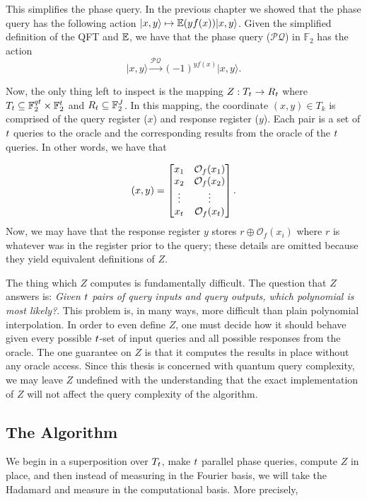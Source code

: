 \documentclass[12pt,twoside]{reedthesis}
\theoremstyle{definition}
\newlength{\arrow}
\newcommand{\F}{\mathbb{F}}
\newcommand{\ket}[1]{\ensuremath{\lvert #1\rangle}\xspace}
\begin{document}
This simplifies the phase query. In the previous chapter we showed that the phase query has the following action $\ket{x,y} \mapsto \expf(yf(x))\ket{x,y}$. Given the simplified definition of the QFT and $\mathbb{E}$, we have that the phase query ($\mathcal{PQ}$) in $\F_2$ has the action
\begin{equation}
\ket{x,y} \xrightarrow{\mathcal{PQ}} (-1)^{yf(x)} \ket{x,y}.
\end{equation}

Now, the only thing left to inspect is the mapping $Z: T_t \rightarrow R_t$ where $T_\numq \subseteq \F_2^{\numin \numq} \times \F_2^\numq$ and $R_\numq \subseteq \F_2^\srmexp$. In this mapping, the coordinate $(x,y) \in T_k$ is comprised of the query register ($x$) and response register ($y$). Each pair is a set of $t$ queries to the oracle and the corresponding results from the oracle of the $t$ queries. In other words, we have that

\begin{equation*}
(x, y) =
\begin{bmatrix}
x_1 & \mathcal{O}_f(x_1) \\
x_2 & \mathcal{O}_f(x_2)\\
\vdots & \vdots \\
x_t & \mathcal{O}_f(x_t)
\end{bmatrix}.
\end{equation*}
Now,  we may have that the response register $y$ stores $r \oplus \mathcal{O}_f(x_i)$  where $r$ is whatever was in the register prior to the query; these details are omitted because they yield equivalent definitions of $Z$.

The thing which $Z$ computes is fundamentally difficult. The question that $Z$ answers is: \textit{Given $t$ pairs of query inputs and query outputs, which polynomial is most likely?}. This problem is, in many ways, more difficult than plain polynomial interpolation. In order to even define $Z$, one must decide how it should behave given every possible $t$-set of input queries and all possible responses from the oracle. The one guarantee on $Z$ is that it computes the results in place without any oracle access. Since this thesis is concerned with quantum query complexity, we may leave $Z$ undefined with the understanding that the exact implementation of $Z$ will not affect the query complexity of the algorithm.

\subsection{The Algorithm}
We begin in a superposition over $T_t$, make $t$ parallel phase queries, compute $Z$ in place, and then instead of  measuring in the Fourier basis, we will take the Hadamard and measure in the computational basis. More precisely,
\end{document}
